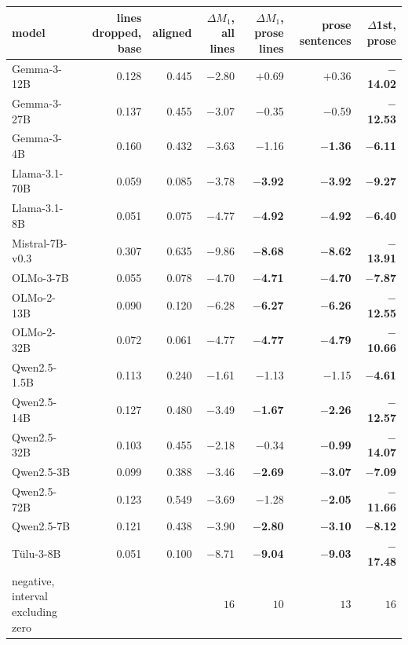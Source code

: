 \begin{center}\scriptsize\setlength{\tabcolsep}{3pt}
\begin{tabular}{lrrrrrr}\toprule
model & lines dropped, base & aligned & $\Delta M_1$, all lines & $\Delta M_1$, prose lines & prose sentences & $\Delta$1st, prose \\ \midrule
Gemma-3-12B & 0.128 & 0.445 & $-$2.80 & $+$0.69 & $+$0.36 & \textbf{$-$14.02} \\
Gemma-3-27B & 0.137 & 0.455 & $-$3.07 & $-$0.35 & $-$0.59 & \textbf{$-$12.53} \\
Gemma-3-4B & 0.160 & 0.432 & $-$3.63 & $-$1.16 & \textbf{$-$1.36} & \textbf{$-$6.11} \\
Llama-3.1-70B & 0.059 & 0.085 & $-$3.78 & \textbf{$-$3.92} & \textbf{$-$3.92} & \textbf{$-$9.27} \\
Llama-3.1-8B & 0.051 & 0.075 & $-$4.77 & \textbf{$-$4.92} & \textbf{$-$4.92} & \textbf{$-$6.40} \\
Mistral-7B-v0.3 & 0.307 & 0.635 & $-$9.86 & \textbf{$-$8.68} & \textbf{$-$8.62} & \textbf{$-$13.91} \\
OLMo-3-7B & 0.055 & 0.078 & $-$4.70 & \textbf{$-$4.71} & \textbf{$-$4.70} & \textbf{$-$7.87} \\
OLMo-2-13B & 0.090 & 0.120 & $-$6.28 & \textbf{$-$6.27} & \textbf{$-$6.26} & \textbf{$-$12.55} \\
OLMo-2-32B & 0.072 & 0.061 & $-$4.77 & \textbf{$-$4.77} & \textbf{$-$4.79} & \textbf{$-$10.66} \\
Qwen2.5-1.5B & 0.113 & 0.240 & $-$1.61 & $-$1.13 & $-$1.15 & \textbf{$-$4.61} \\
Qwen2.5-14B & 0.127 & 0.480 & $-$3.49 & \textbf{$-$1.67} & \textbf{$-$2.26} & \textbf{$-$12.57} \\
Qwen2.5-32B & 0.103 & 0.455 & $-$2.18 & $-$0.34 & \textbf{$-$0.99} & \textbf{$-$14.07} \\
Qwen2.5-3B & 0.099 & 0.388 & $-$3.46 & \textbf{$-$2.69} & \textbf{$-$3.07} & \textbf{$-$7.09} \\
Qwen2.5-72B & 0.123 & 0.549 & $-$3.69 & $-$1.28 & \textbf{$-$2.05} & \textbf{$-$11.66} \\
Qwen2.5-7B & 0.121 & 0.438 & $-$3.90 & \textbf{$-$2.80} & \textbf{$-$3.10} & \textbf{$-$8.12} \\
T\"ulu-3-8B & 0.051 & 0.100 & $-$8.71 & \textbf{$-$9.04} & \textbf{$-$9.03} & \textbf{$-$17.48} \\
\midrule
negative, interval excluding zero & & & $16$ & $10$ & $13$ & $16$ \\
\bottomrule\end{tabular}\end{center}
